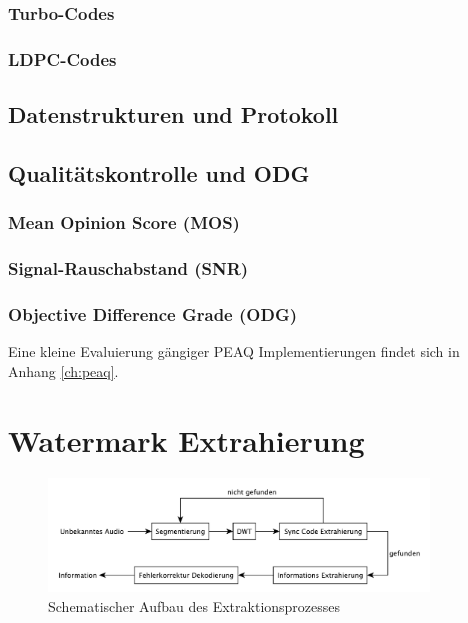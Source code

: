 \subsubsection{Turbo-Codes}

\subsubsection{LDPC-Codes}

\subsection{Datenstrukturen und Protokoll}
\label{sec:protokoll}

\subsection{Qualitätskontrolle und ODG }
\label{sec:qualitaetskontrolle}

\subsubsection{Mean Opinion Score (MOS)}

\cite{??}

\subsubsection{Signal-Rauschabstand (SNR)} 

\subsubsection{Objective Difference Grade (ODG)} 

Eine kleine Evaluierung gängiger PEAQ Implementierungen findet sich in Anhang \ref{ch:peaq}.


\section{Watermark Extrahierung}
\label{sec:extraction}

\begin{figure}[tb]
	\centering
	\includegraphics[width=0.9\textwidth]{figures/diagram-decoder.pdf}
	\caption{Schematischer Aufbau des Extraktionsprozesses}
	\label{fig:diagram-decoder}
\end{figure}

